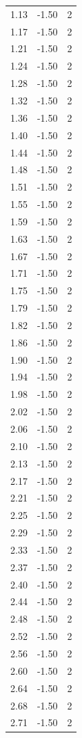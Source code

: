 \begin{longtable}{lrr}
  1.13 & -1.50 & 2 \\
  1.17 & -1.50 & 2 \\
  1.21 & -1.50 & 2 \\
  1.24 & -1.50 & 2 \\
  1.28 & -1.50 & 2 \\
  1.32 & -1.50 & 2 \\
  1.36 & -1.50 & 2 \\
  1.40 & -1.50 & 2 \\
  1.44 & -1.50 & 2 \\
  1.48 & -1.50 & 2 \\
  1.51 & -1.50 & 2 \\
  1.55 & -1.50 & 2 \\
  1.59 & -1.50 & 2 \\
  1.63 & -1.50 & 2 \\
  1.67 & -1.50 & 2 \\
  1.71 & -1.50 & 2 \\
  1.75 & -1.50 & 2 \\
  1.79 & -1.50 & 2 \\
  1.82 & -1.50 & 2 \\
  1.86 & -1.50 & 2 \\
  1.90 & -1.50 & 2 \\
  1.94 & -1.50 & 2 \\
  1.98 & -1.50 & 2 \\
  2.02 & -1.50 & 2 \\
  2.06 & -1.50 & 2 \\
  2.10 & -1.50 & 2 \\
  2.13 & -1.50 & 2 \\
  2.17 & -1.50 & 2 \\
  2.21 & -1.50 & 2 \\
  2.25 & -1.50 & 2 \\
  2.29 & -1.50 & 2 \\
  2.33 & -1.50 & 2 \\
  2.37 & -1.50 & 2 \\
  2.40 & -1.50 & 2 \\
  2.44 & -1.50 & 2 \\
  2.48 & -1.50 & 2 \\
  2.52 & -1.50 & 2 \\
  2.56 & -1.50 & 2 \\
  2.60 & -1.50 & 2 \\
  2.64 & -1.50 & 2 \\
  2.68 & -1.50 & 2 \\
  2.71 & -1.50 & 2 \\

\end{longtable}
